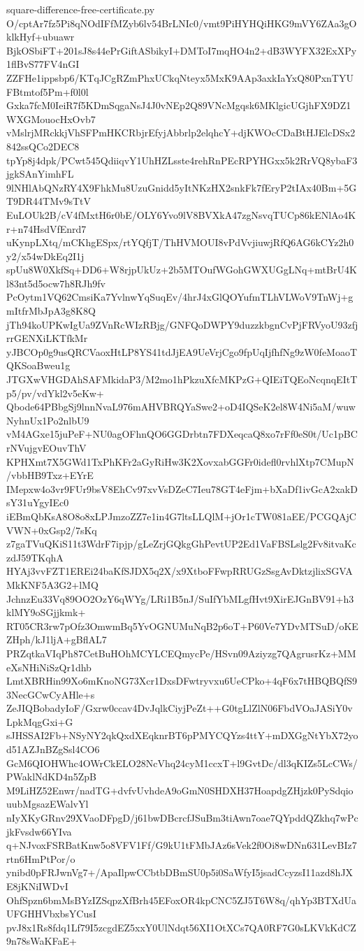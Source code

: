 \documentclass[11pt]{article}
\theoremstyle{definition}
\theoremstyle{remark}
\begin{document}
\begin{filecontents*}[overwrite]{square-difference-free-certificate.py}
O/cptAr7fz5Pi8qNOdIFfMZyb6lv54BrLNIc0/vmt9PiHYHQiHKG9mVY6ZAa3gOklkHyf+ubuawr
BjkOSbiFT+201sJ8s44ePrGiftASbikyI+DMToI7mqHO4n2+dB3WYFX32ExXPy1flBvS77FV4nGI
ZZFHe1ippsbp6/KTqJCgRZmPhxUCkqNteyx5MxK9AAp3axkIaYxQ80PxnTYUFBtmtof5Pm+f0l0l
Gxka7fcM0IeiR7f5KDmSqgaNsJ4J0vNEp2Q89VNcMgqsk6MKlgicUGjhFX9DZ1WXGMouocHxOvb7
vMslrjMRckkjVhSFPmHKCRbjrEfyjAbbrlp2elqhcY+djKWOcCDaBtHJElcDSx2842ssQCo2DEC8
tpYp8j4dpk/PCwt545QdiiqvY1UhHZLsste4rehRnPEcRPYHGxx5k2RrVQ8ybaF3jgkSAnYimhFL
9lNHlAbQNzRY4X9FhkMu8UzuGnidd5yItNKzHX2snkFk7fEryP2tIAx40Bm+5GT9DR44TMv9sTtV
EuLOUk2B/cV4fMxtH6r0bE/OLY6Yvo9lV8BVXkA47zgNsvqTUCp86kENlAo4Kr+n74HsdVfEnrd7
uKynpLXtq/mCKhgESpx/rtYQfjT/ThHVMOUI8vPdVvjiuwjRfQ6AG6kCYz2h0y2/x54wDkEq2I1j
spUu8W0XkfSq+DD6+W8rjpUkUz+2b5MTOufWGohGWXUGgLNq+mtBrU4Kl83nt5d5ocw7h8RJh9fv
PcOytm1VQ62CmsiKa7YvlnwYqSuqEv/4hrJ4xGlQOYufmTLhVLWoV9TnWj+gmItfrMbJpA3g8K8Q
jTh94koUPKwIgUa9ZVnRcWIzRBjg/GNFQoDWPY9duzzkbgnCvPjFRVyoU93zfjrrGENXiLKTfkMr
yJBCOp0g9usQRCVaoxHtLP8YS41tdJjEA9UeVrjCgo9fpUqIjfhfNg9zW0feMoaoTQKSoaBweu1g
JTGXwVHGDAhSAFMkidaP3/M2mo1hPkzuXfcMKPzG+QIEiTQEoNcqnqEItTp5/pv/vdYkl2v5eKw+
Qbode64PBbgSj9lnnNvaL976mAHVBRQYaSwe2+oD4IQSeK2el8W4Ni5aM/wuwNyhnUx1Po2nlbU9
vM4AGxe15juPeF+NU0agOFhnQO6GGDrbtn7FDXeqcaQ8xo7rFf0eS0t/Uc1pBCrNVujgvEOuvThV
KPHXmt7X5GWd1TxPhKFr2aGyRiHw3K2XovxabGGFr0idefl0rvhlXtp7CMupN/vbbHB9Txz+EYrE
IMepxw4o3vr9FUr9bsV8EhCv97xvVsDZeC7Ieu78GT4eFjm+bXaDf1ivGcA2xakDsY31uYgyIEc0
iEBmQbKsA8O8o8xLPJmzoZZ7e1in4G7ltsLLQlM+jOr1cTW081aEE/PCGQAjCVWN+0xGsp2/7sKq
z7gaTVuQKiS11t3WdrF7ipjp/gLeZrjGQkgGhPevtUP2Ed1VaFBSLslg2Fv8itvaKczdJ59TKqhA
HYAj3vvFZT1EREi24baKfSJDX5q2X/x9XtboFFwpRRUGzSsgAvDktzjlixSGVAMkKNF5A3G2+lMQ
JchnzEu33Vq89OO2OzY6qWYg/LRi1B5nJ/SuIfYbMLgfHvt9XirEJGnBV91+h3klMY9oSGjjkmk+
RT05CR3rw7pOfz3OmwmBq5YvOGNUMuNqB2p6oT+P60Ve7YDvMTSuD/oKEZHph/kJ1ljA+gBflAL7
PRZqtkaVIqPh87CetBuHOhMCYLCEQmycPe/HSvn09Aziyzg7QAgrusrKz+MMeXsNHiNiSzQr1dhb
LmtXBRHin99Xo6mKnoNG73Xcr1DxsDFwtryvxu6UeCPko+4qF6x7tHBQBQfS93NecGCwCyAHle+s
ZeJIQBobadyIoF/Gxrw0ccav4DvJqlkCiyjPeZt++G0tgLlZlN06FbdVOaJASiY0vLpkMqgGxi+G
sJHSSAI2Fb+NSyNY2qkQxdXEqknrBT6pPMYCQYzs4ttY+mDXGgNtYbX72yod51AZJnBZgSsl4CO6
GcM6QIOHWhc4OWrCkELO28NcVhq24cyM1ccxT+l9GvtDc/dl3qKIZs5LcCWs/PWaklNdKD4n5ZpB
M9LiHZ52Enwr/nadTG+dvfvUvhdeA9oGmN0SHDXH37HoapdgZHjzk0PySdqiouubMgsazEWalvYl
nIyXKyGRnv29XVaoDFpgD/j61bwDBcrcfJSuBm3tiAwn7oae7QYpddQZkhq7wPcjkFvsdw66YIva
q+NJvoxFSRBatKnw5o8VFV1Ff/G9kU1tFMbJAz6sVek2f0Oi8wDNn631LevBIz7rtn6HmPtPor/o
ynibd0pFRJwnVg7+/ApaIlpwCCbtbDBmSU0p5i0SaWfyI5jsadCcyzsI11azd8hJXE8jKNiIWDvI
OhfSpzn6bmMsBYzIZSqpzXfBrh45EFoxOR4kpCNC5ZJ5T6W8q/qhYp3BTXdUaUFGHHVbxbsYCusI
pvJ8x1Rs8fdq1Lf79I5zcgdEZ5xxY0UlNdqt56XI1OtXCs7QA0RF7G0sLKVkKdCZ9n78sWaKFaE+

\end{filecontents*}
\end{document}
